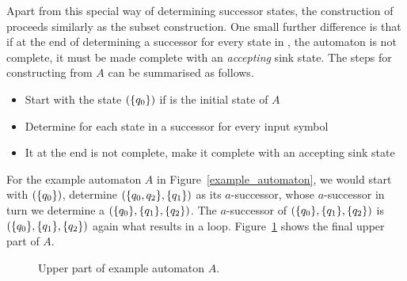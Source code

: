  

Apart from this special way of determining successor states, the construction of \Bp proceeds similarly as the subset construction. One small further difference is that if at the end of determining a successor for every state in \Bp, the automaton is not complete, it must be made complete with an \emph{accepting} sink state. The steps for constructing \Bp from $A$ can be summarised as follows.

\begin{itemize}
\item Start with the state $(\{q_{0}\})$ if  is the initial state of $A$
\item Determine for each state in \Bp a successor for every input symbol
\item It at the end \Bp is not complete, make it complete with an accepting sink state
\end{itemize}

For the example automaton $A$ in Figure~\ref{example_automaton}, we would start with $(\{q_{0}\})$, determine $(\{q_{0},q_{2}\},\{q_{1}\})$ as its $a$-successor, whose $a$-successor in turn we determine a $(\{q_{0}\},\{q_{1}\},\{q_{2}\})$. The $a$-successor of $(\{q_{0}\},\{q_{1}\},\{q_{2}\})$ is $(\{q_{0}\},\{q_{1}\},\{q_{2}\})$ again what results in a loop. Figure~\ref{upper_part} shows the final upper part \Bp of $A$.

\begin{figure}
\begin{center}
\UpperPart
\caption{Upper part \Bp of example automaton $A$.}
\label{upper_part}
\end{center}
\end{figure} 



